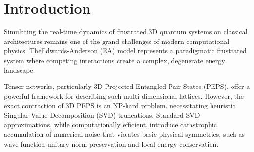 \documentclass[sigconf,nonacm=false]{acmart}
\begin{document}


\maketitle

\begin{center}
\end{center}
\bigskip


\section{Introduction}
\label{sec:intro}

Simulating the real-time dynamics of frustrated 3D quantum systems on classical architectures remains one of the grand challenges of modern computational physics. TheEdwards-Anderson (EA) model represents a paradigmatic frustrated system where competing interactions create a complex, degenerate energy landscape. 

Tensor networks, particularly 3D Projected Entangled Pair States (PEPS), offer a powerful framework for describing such multi-dimensional lattices. However, the exact contraction of 3D PEPS is an NP-hard problem, necessitating heuristic Singular Value Decomposition (SVD) truncations. Standard SVD approximations, while computationally efficient, introduce catastrophic accumulation of numerical noise that violates basic physical symmetries, such as wave-function unitary norm preservation and local energy conservation.
\end{document}
